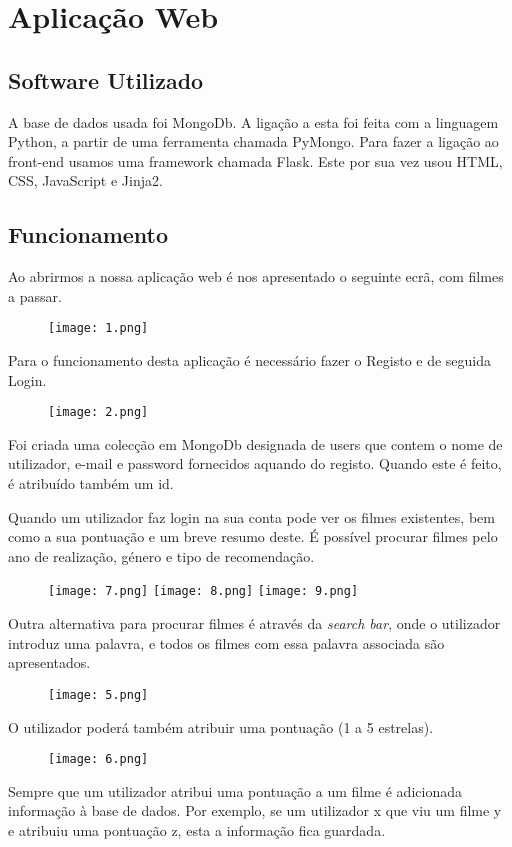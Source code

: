\section{Aplicação Web}

\subsection{Software Utilizado}

A base de dados usada foi MongoDb.
A ligação a esta foi feita com a linguagem Python, a partir de uma ferramenta chamada PyMongo.
Para fazer a ligação ao front-end usamos uma framework chamada Flask.
Este por sua vez usou HTML, CSS, JavaScript e Jinja2.

\subsection{Funcionamento}

Ao abrirmos a nossa aplicação web é nos apresentado o seguinte ecrã, com filmes a passar.

\begin{figure}[H]
\centering
\texttt{[image: 1.png]}
\end{figure}


Para o funcionamento desta aplicação é necessário fazer o Registo e de seguida Login.
\begin{figure}[H]
\centering
\texttt{[image: 2.png]}
\end{figure}


Foi criada uma colecção em MongoDb designada de users que contem o nome de utilizador, e-mail e password fornecidos aquando do registo. Quando este é feito, é atribuído também um id.

Quando um utilizador faz login na sua conta pode ver os filmes existentes, bem como a sua pontuação e um breve resumo deste. É possível procurar filmes pelo ano de realização, género e tipo de recomendação. 

 \begin{figure}[H]
\centering
\texttt{[image: 7.png]}
\texttt{[image: 8.png]}
\texttt{[image: 9.png]}
\end{figure}

Outra alternativa para procurar filmes é através da \textit{search bar}, onde o utilizador introduz uma palavra, e todos os filmes com essa palavra associada são apresentados.


\begin{figure}[H]
\centering
\texttt{[image: 5.png]}
\end{figure}

O utilizador poderá também atribuir uma pontuação (1 a 5 estrelas).

\begin{figure}[H]
\centering
\texttt{[image: 6.png]}
\end{figure}

Sempre que um utilizador atribui uma pontuação a um filme é adicionada informação à base de dados. Por exemplo, se um utilizador x que viu um filme y e atribuiu uma pontuação z, esta a informação fica guardada.


